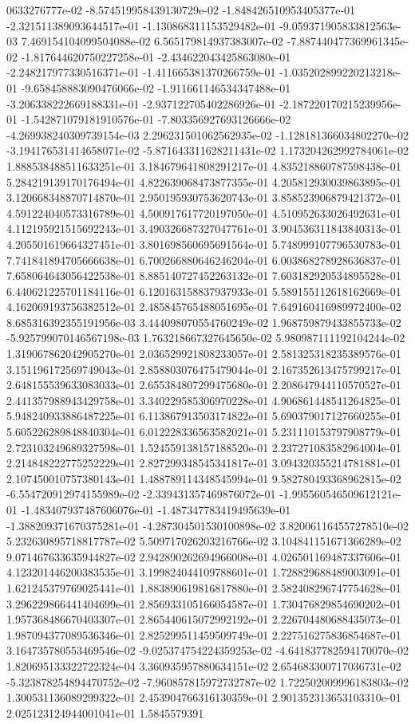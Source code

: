 0633276777e-02	-8.574519958439130729e-02	-1.848426510953405377e-01	-2.321511389093644517e-01	-1.130868311153529482e-01	-9.059371905833812563e-03	7.469154104099504088e-02	6.565179814937383007e-02	-7.887440477369961345e-02	-1.817644620750227258e-01	-2.434622043425863080e-01	-2.248217977330516371e-01	-1.411665381370266759e-01	-1.035202899220213218e-01	-9.658458883090476066e-02	-1.911661146534347488e-01	-3.206338222669188331e-01	-2.937122705402286926e-01	-2.187220170215239956e-01	-1.542871079181910576e-01	-7.803356927693126666e-02	-4.269938240309739154e-03	2.296231501062562935e-02	-1.128181366034802270e-02	-3.194176531414658071e-02	-5.871643311628211431e-02	1.173204262992784061e-02	1.888538488511633251e-01	3.184679641808291217e-01	4.835218860787598438e-01	5.284219139170176494e-01	4.822639068473877355e-01	4.205812930039863895e-01	3.120668348870714870e-01	2.950195930753620743e-01	3.858523906879421372e-01	4.591224040573316789e-01	4.500917617720197050e-01	4.510952633026492631e-01	4.112195921515692243e-01	3.490326687327047761e-01	3.904536311843840313e-01	4.205501619664327451e-01	3.801698560695691564e-01	5.748999107796530783e-01	7.741841894705666638e-01	6.700266880646246204e-01	6.003868278928636837e-01	7.658064643056422538e-01	8.885140727452263132e-01	7.603182920534895528e-01	6.440621225701184116e-01	6.120163158837937933e-01	5.589155112618162669e-01	4.162069193756382512e-01	2.485845765488051695e-01	7.649160416989972400e-02	8.685316392355191956e-03	3.444098070554760249e-02	1.968759879433855733e-02	-5.925799070146567198e-03	1.763218667327645650e-02	5.980987111192104244e-02	1.319067862042905270e-01	2.036529921808233057e-01	2.581325318235389576e-01	3.151196172569749043e-01	2.858803076475479044e-01	2.167352613475799217e-01	2.648155539633083033e-01	2.655384807299475680e-01	2.208647944110570527e-01	2.441357988943429758e-01	3.340229585306970228e-01	4.906861448541264825e-01	5.948240933886487225e-01	6.113867913503174822e-01	5.690379017127660255e-01	5.605226289848840304e-01	6.012228336563582021e-01	5.231110153797908779e-01	2.723103249689327598e-01	1.524559138157188520e-01	2.237271083582964004e-01	2.214848222775252229e-01	2.827299348545341817e-01	3.094320355214781881e-01	2.107450010757380143e-01	1.488789114348545994e-01	9.582780493368962815e-02	-6.554720912974155989e-02	-2.339431357469876072e-01	-1.995560546509612121e-01	-1.483407937487606076e-01	-1.487347783419495639e-01	-1.388209371670375281e-01	-4.287304501530100898e-02	3.820061164557278510e-02	5.232630895718817787e-02	5.509717026203216766e-02	3.104841151671366289e-02	9.071467633635944827e-02	2.942890262694966008e-01	4.026501169487337606e-01	4.123201446200383535e-01	3.199824044109788601e-01	1.728829688489003091e-01	1.621245379769025441e-01	1.883890619816817880e-01	2.582408296747754628e-01	3.296229866441404699e-01	2.856933105166054587e-01	1.730476829854690202e-01	1.957368486670403307e-01	2.865440615072992192e-01	2.226704480688435073e-01	1.987094377089536346e-01	2.825299511459509749e-01	2.227516275836854687e-01	3.164735780553469546e-02	-9.025374754224359253e-02	-4.641837782594170070e-02	1.820695133322722324e-04	3.360935957880634151e-02	2.654683300717036731e-02	-5.323878254894470752e-02	-7.960857815972732787e-02	1.722502009996183803e-02	1.300531136089299322e-01	2.453904766316130359e-01	2.901352313653103310e-01	2.025123124944001041e-01	1.5845579391